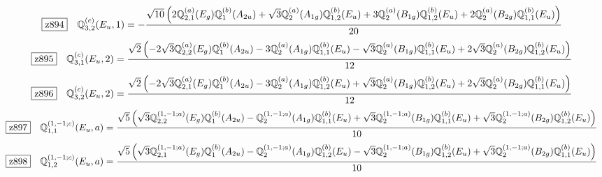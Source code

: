 \documentclass[fleqn,10pt,landscape]{jsarticle}
\begin{document}
\begin{dmath*}
\hspace*{3mm}\fbox{z894}\quad \mathbb{Q}_{3,2}^{(c)}(E_{u},1)=- \frac{\sqrt{10} \left(2 \mathbb{Q}_{2,1}^{(a)}(E_{g}) \mathbb{Q}_{1}^{(b)}(A_{2u}) + \sqrt{3} \mathbb{Q}_{2}^{(a)}(A_{1g}) \mathbb{Q}_{1,2}^{(b)}(E_{u}) + 3 \mathbb{Q}_{2}^{(a)}(B_{1g}) \mathbb{Q}_{1,2}^{(b)}(E_{u}) + 2 \mathbb{Q}_{2}^{(a)}(B_{2g}) \mathbb{Q}_{1,1}^{(b)}(E_{u})\right)}{20}
\end{dmath*}
\begin{dmath*}
\hspace*{3mm}\fbox{z895}\quad \mathbb{Q}_{3,1}^{(c)}(E_{u},2)=\frac{\sqrt{2} \left(- 2 \sqrt{3} \mathbb{Q}_{2,2}^{(a)}(E_{g}) \mathbb{Q}_{1}^{(b)}(A_{2u}) - 3 \mathbb{Q}_{2}^{(a)}(A_{1g}) \mathbb{Q}_{1,1}^{(b)}(E_{u}) - \sqrt{3} \mathbb{Q}_{2}^{(a)}(B_{1g}) \mathbb{Q}_{1,1}^{(b)}(E_{u}) + 2 \sqrt{3} \mathbb{Q}_{2}^{(a)}(B_{2g}) \mathbb{Q}_{1,2}^{(b)}(E_{u})\right)}{12}
\end{dmath*}
\begin{dmath*}
\hspace*{3mm}\fbox{z896}\quad \mathbb{Q}_{3,2}^{(c)}(E_{u},2)=\frac{\sqrt{2} \left(- 2 \sqrt{3} \mathbb{Q}_{2,1}^{(a)}(E_{g}) \mathbb{Q}_{1}^{(b)}(A_{2u}) - 3 \mathbb{Q}_{2}^{(a)}(A_{1g}) \mathbb{Q}_{1,2}^{(b)}(E_{u}) + \sqrt{3} \mathbb{Q}_{2}^{(a)}(B_{1g}) \mathbb{Q}_{1,2}^{(b)}(E_{u}) + 2 \sqrt{3} \mathbb{Q}_{2}^{(a)}(B_{2g}) \mathbb{Q}_{1,1}^{(b)}(E_{u})\right)}{12}
\end{dmath*}
\begin{dmath*}
\hspace*{3mm}\fbox{z897}\quad \mathbb{Q}_{1,1}^{(1,-1;c)}(E_{u},a)=\frac{\sqrt{5} \left(\sqrt{3} \mathbb{Q}_{2,2}^{(1,-1;a)}(E_{g}) \mathbb{Q}_{1}^{(b)}(A_{2u}) - \mathbb{Q}_{2}^{(1,-1;a)}(A_{1g}) \mathbb{Q}_{1,1}^{(b)}(E_{u}) + \sqrt{3} \mathbb{Q}_{2}^{(1,-1;a)}(B_{1g}) \mathbb{Q}_{1,1}^{(b)}(E_{u}) + \sqrt{3} \mathbb{Q}_{2}^{(1,-1;a)}(B_{2g}) \mathbb{Q}_{1,2}^{(b)}(E_{u})\right)}{10}
\end{dmath*}
\begin{dmath*}
\hspace*{3mm}\fbox{z898}\quad \mathbb{Q}_{1,2}^{(1,-1;c)}(E_{u},a)=\frac{\sqrt{5} \left(\sqrt{3} \mathbb{Q}_{2,1}^{(1,-1;a)}(E_{g}) \mathbb{Q}_{1}^{(b)}(A_{2u}) - \mathbb{Q}_{2}^{(1,-1;a)}(A_{1g}) \mathbb{Q}_{1,2}^{(b)}(E_{u}) - \sqrt{3} \mathbb{Q}_{2}^{(1,-1;a)}(B_{1g}) \mathbb{Q}_{1,2}^{(b)}(E_{u}) + \sqrt{3} \mathbb{Q}_{2}^{(1,-1;a)}(B_{2g}) \mathbb{Q}_{1,1}^{(b)}(E_{u})\right)}{10}
\end{dmath*}
\end{document}
